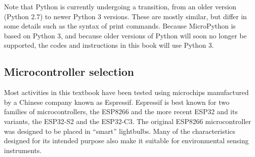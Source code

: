 \begin{kaobox}[frametitle=Once and future Python]
	Note that Python is currently undergoing a transition, from an older version (Python 2.7) to newer Python 3 versions.
	These are mostly similar, but differ in some details such as the syntax of print commands. Because MicroPython is based on Python 3, and because older versions of Python will soon no longer be supported, the codes and instructions in this book will use Python 3.
\end{kaobox}




\subsection{Microcontroller selection}  
Most activities in this textbook have been tested using microchips manufactured by a Chinese company known as Espressif.
Espressif is best known for two families of microcontrollers, the ESP8266 and the more recent ESP32 and its variants, the ESP32-S2 and the ESP32-C3. 
The original ESP8266 microcontroller was designed to be placed in ``smart'' lightbulbs.
Many of the characteristics designed for its intended purpose also make it suitable for environmental sensing instruments.

